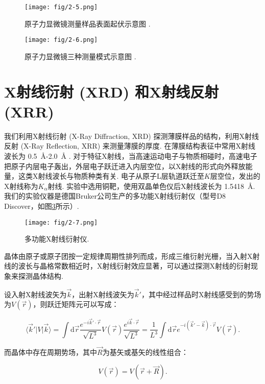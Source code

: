 \documentclass[12pt,a4paper,openany,twoside,UTF-8]{book}
\begin{document}
\begin{figure}[htbp]
\centering
\texttt{[image: fig/2-5.png]}
\caption{原子力显微镜测量样品表面起伏示意图 \cite{ref24}.}
\label{fig:2-5} 
\end{figure}

\begin{figure}[htbp]
\centering
\texttt{[image: fig/2-6.png]}
\caption{原子力显微镜三种测量模式示意图 \cite{ref24}.}
\label{fig:2-6} 
\end{figure}

\section{X射线衍射 (XRD) 和X射线反射 (XRR)}
我们利用X射线衍射 (X-Ray Diffraction, XRD) 探测薄膜样品的结构，利用X射线反射 (X-Ray Reflection, XRR) 来测量薄膜的厚度. 在薄膜结构表征中常用X射线波长为 \SI{0.5}{Å}-\SI{2.0}{Å} \cite{ref25}. 对于特征X射线，当高速运动电子与物质相碰时，高速电子把原子内层电子轰出，外层电子跃迁进入内层空位，以X射线的形式向外释放能量，这类X射线波长与物质种类有关. 电子从原子L层轨道跃迁至$K$层空位，发出的X射线称为$K_\alpha$射线. 实验中选用铜靶，使用双晶单色仪后X射线波长为 \SI{1.5418}{Å}. 我们的实验仪器是德国Bruker公司生产的多功能X射线衍射仪（型号D8 Discover，如图\ref{fig:2-7}所示）.

\begin{figure}[htbp]
\centering
\texttt{[image: fig/2-7.png]}
\caption{多功能X射线衍射仪.}
\label{fig:2-7} 
\end{figure}

晶体由原子或原子团按一定规律周期性排列而成，形成三维衍射光栅，当入射X射线的波长与晶格常数相近时，X射线衍射效应显著，可以通过探测X射线的衍射现象来探测晶体结构.

设入射X射线波矢为$\vec{k}$，出射X射线波矢为$\vec{k}'$，其中经过样品时X射线感受到的势场为$V(\vec{r})$，则跃迁矩阵元可以写成：

\begin{equation}
\langle \vec{k}'|V|\vec{k}\rangle=\int\mathrm{d}\vec{r}\frac{e^{-i\vec{k}'\cdot\vec{r}}}{\sqrt{L^3}}V(\vec{r})\frac{e^{i\vec{k}\cdot\vec{r}}}{\sqrt{L^3}}=\frac{1}{L^3}\int\mathrm{d}\vec{r}e^{-i(\vec{k}'-\vec{k})\cdot\vec{r}}V(\vec{r}).
\label{eq:2-1}
\end{equation}
 
而晶体中存在周期势场，其中$\vec{R}$为基矢或基矢的线性组合：

\begin{equation}
V(\vec{r})=V(\vec{r}+\vec{R}).
\label{eq:2-2}
\end{equation}
\end{document}
